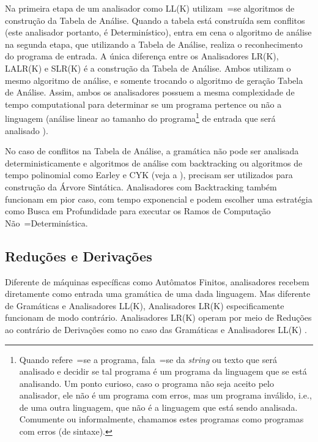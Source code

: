 Na primeira etapa de um analisador como LL(K) utilizam~=se algoritmos de construção da Tabela de Análise.
Quando a tabela está construída sem conflitos (este analisador portanto,
é Determinístico),
entra em cena o algoritmo de análise na segunda etapa,
que utilizando a Tabela de Análise,
realiza o reconhecimento do programa de entrada.
A única diferença entre os Analisadores LR(K),
LALR(K) e
SLR(K) é a construção da Tabela de Análise.
Ambos utilizam o mesmo algoritmo de análise,
e somente trocando o algoritmo de geração Tabela de Análise.
Assim,
ambos os analisadores possuem a mesma complexidade de tempo computational para determinar se um programa pertence ou
não a linguagem (análise linear ao tamanho do programa\footnote{
Quando refere~=se a programa,
fala~=se da \textit{string} ou
texto que será analisado e
decidir se tal programa é um programa da linguagem que se está analisando.
Um ponto curioso,
caso o programa não seja aceito pelo analisador,
ele não é um programa com erros,
mas um programa inválido,
i.e.,
de uma outra linguagem,
que não é a linguagem que está sendo analisada.
Comumente ou
informalmente,
chamamos estes programas como programas com erros (de sintaxe).
}
de entrada que será analisado \cite{knuthLrParser1965,linearLL1AndLR1Grammars,generalContextFreeParsingAlgorithm}).

No caso de conflitos na Tabela de Análise,
a gramática não pode ser analisada deterministicamente e
algoritmos de análise com backtracking ou
algoritmos de tempo polinomial como Earley e
CYK (veja a ),
precisam ser utilizados para construção da Árvore Sintática.
%
Analisadores com Backtracking também funcionam em pior caso,
com tempo exponencial e
podem escolher uma estratégia como Busca em Profundidade \cite{cormenIntroductionToAlgorithms} para executar os Ramos de Computação Não~=Determinística.


\subsection{Reduções e Derivações}
\label{section:reducoesEderivacoes}

Diferente de máquinas específicas como Autômatos Finitos,
analisadores recebem diretamente como entrada uma gramática de uma dada linguagem.
Mas diferente de Gramáticas e
Analisadores LL(K),
Analisadores LR(K) especificamente funcionam de modo contrário.
Analisadores LR(K) operam por meio de Reduções ao contrário de Derivações como no caso das Gramáticas e
Analisadores LL(K) \cite{ahoCompilerDragonBook}.

